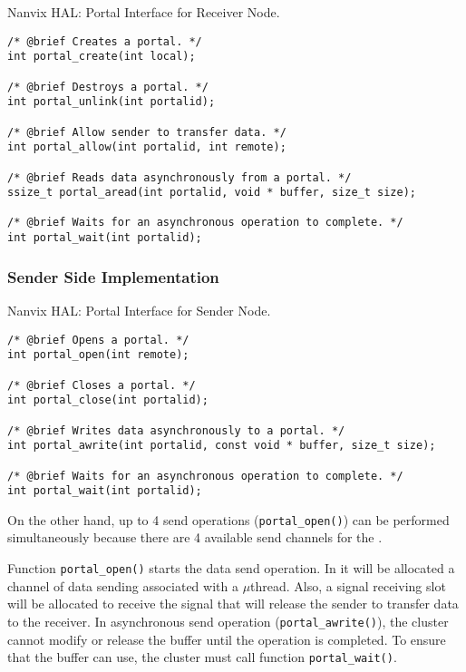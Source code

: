 \begin{listing}[!tb]
\caption{Nanvix HAL: Portal Interface for Receiver Node.}
\label{code:hal-portal-receiver}
\begin{verbatim}
/* @brief Creates a portal. */
int portal_create(int local);

/* @brief Destroys a portal. */
int portal_unlink(int portalid);

/* @brief Allow sender to transfer data. */
int portal_allow(int portalid, int remote);

/* @brief Reads data asynchronously from a portal. */
ssize_t portal_aread(int portalid, void * buffer, size_t size);

/* @brief Waits for an asynchronous operation to complete. */
int portal_wait(int portalid);
\end{verbatim}
\end{listing}

			\subsubsection{Sender Side Implementation}

\begin{listing}[!tb]
\caption{Nanvix HAL: Portal Interface for Sender Node.}
\label{code:hal-portal-sender}
\begin{verbatim}
/* @brief Opens a portal. */
int portal_open(int remote);

/* @brief Closes a portal. */
int portal_close(int portalid);

/* @brief Writes data asynchronously to a portal. */
int portal_awrite(int portalid, const void * buffer, size_t size);

/* @brief Waits for an asynchronous operation to complete. */
int portal_wait(int portalid);
\end{verbatim}
\end{listing}

				On the other hand, up to 4 send operations (\texttt{portal\_open()})
				can be performed simultaneously because there are 4 available send
				channels for the \portal.

				Function \texttt{portal\_open()} starts the data send operation.
				In it will be allocated a channel of data sending associated with
				a $\mu$thread.
				Also, a signal receiving slot will be allocated to receive the
				signal that will release the sender to transfer data to the receiver.
				In asynchronous send operation (\texttt{portal\_awrite()}), the cluster
				cannot modify or release the buffer until the operation is completed.
				To ensure that the buffer can use, the cluster must call function \texttt{portal\_wait()}.

